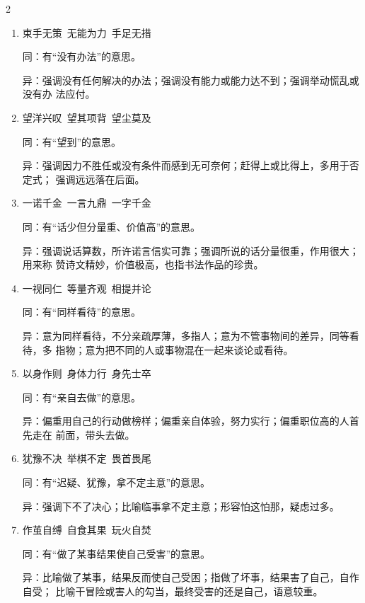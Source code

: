 \documentclass[final,oneside]{ctexbook}
\begin{document}
\begin{multicols}{2}
\begin{enumerate}
      同：有“深入、周密考虑”的意思。

      异：强调周密地计划，往长远里考虑；强调深入细致地考虑；多形容人办事精明老练。

    \item 束手无策~无能为力~手足无措

      同：有“没有办法”的意思。

      异：强调没有任何解决的办法；强调没有能力或能力达不到；强调举动慌乱或没有办
      法应付。

    \item 望洋兴叹~望其项背~望尘莫及

      同：有“望到”的意思。

      异：强调因力不胜任或没有条件而感到无可奈何；赶得上或比得上，多用于否定式；
      强调远远落在后面。

    \item 一诺千金~一言九鼎~一字千金

      同：有“话少但分量重、价值高”的意思。

      异：强调说话算数，所许诺言信实可靠；强调所说的话分量很重，作用很大；用来称
      赞诗文精妙，价值极高，也指书法作品的珍贵。

    \item 一视同仁~等量齐观~相提并论

      同：有“同样看待”的意思。

      异：意为同样看待，不分亲疏厚薄，多指人；意为不管事物间的差异，同等看待，多
      指物；意为把不同的人或事物混在一起来谈论或看待。

    \item 以身作则~身体力行~身先士卒

      同：有“亲自去做”的意思。

      异：偏重用自己的行动做榜样；偏重亲自体验，努力实行；偏重职位高的人首先走在
      前面，带头去做。

    \item 犹豫不决~举棋不定~畏首畏尾

      同：有“迟疑、犹豫，拿不定主意”的意思。

      异：强调下不了决心；比喻临事拿不定主意；形容怕这怕那，疑虑过多。

    \item 作茧自缚~自食其果~玩火自焚

      同：有“做了某事结果使自己受害”的意思。

      异：比喻做了某事，结果反而使自己受困；指做了坏事，结果害了自己，自作自受；
      比喻干冒险或害人的勾当，最终受害的还是自己，语意较重。

  \end{enumerate}
\end{multicols}
\end{document}
